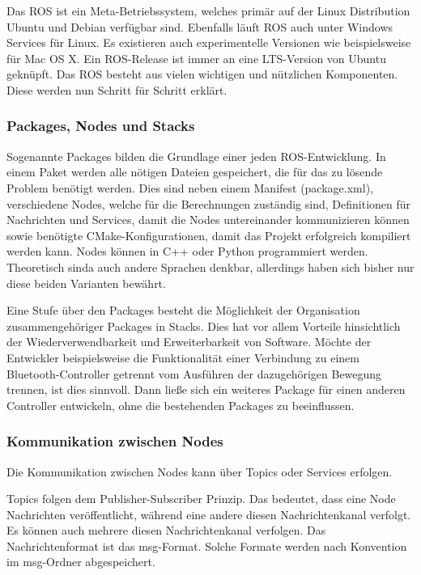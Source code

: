 Das \ac{ROS} ist ein Meta-Betriebssystem, welches primär auf der Linux Distribution Ubuntu und Debian verfügbar sind. Ebenfalls läuft \ac{ROS} auch unter Windows Services für Linux. Es existieren auch experimentelle Versionen wie beispielsweise für Mac OS X. Ein ROS-Release ist immer an eine \ac{LTS}-Version von Ubuntu  geknüpft. Das \ac{ROS} besteht aus vielen wichtigen und nützlichen Komponenten. Diese werden nun Schritt für Schritt erklärt.

\subsubsection{Packages, Nodes und Stacks}

Sogenannte Packages bilden die Grundlage einer jeden \ac{ROS}-Entwicklung. In einem Paket werden alle nötigen Dateien gespeichert, die für das zu lösende Problem benötigt werden. Dies sind neben einem Manifest (package.xml), verschiedene Nodes, welche für die Berechnungen zuständig sind, Definitionen für Nachrichten und Services, damit die Nodes untereinander kommunizieren können sowie benötigte CMake-Konfigurationen, damit das Projekt erfolgreich kompiliert werden kann. Nodes können in C++ oder Python programmiert werden. Theoretisch sinda auch andere Sprachen denkbar, allerdings haben sich bisher nur diese beiden Varianten bewährt.

Eine Stufe über den Packages besteht die Möglichkeit der Organisation zusammengehöriger Packages in Stacks. Dies hat vor allem Vorteile hinsichtlich der Wiederverwendbarkeit und Erweiterbarkeit von Software. Möchte der Entwickler beispielsweise die Funktionalität einer Verbindung zu einem Bluetooth-Controller getrennt vom Ausführen der dazugehörigen Bewegung trennen, ist dies sinnvoll. Dann ließe sich ein weiteres Package für einen anderen Controller entwickeln, ohne die bestehenden Packages zu beeinflussen.

\subsubsection{Kommunikation zwischen Nodes}

Die Kommunikation zwischen Nodes kann über Topics oder Services erfolgen.

Topics folgen dem Publisher-Subscriber Prinzip. Das bedeutet, dass eine Node Nachrichten veröffentlicht, während eine andere diesen Nachrichtenkanal verfolgt. Es können auch mehrere diesen Nachrichtenkanal verfolgen. Das Nachrichtenformat ist das msg-Format. Solche Formate werden nach Konvention im msg-Ordner abgespeichert.

